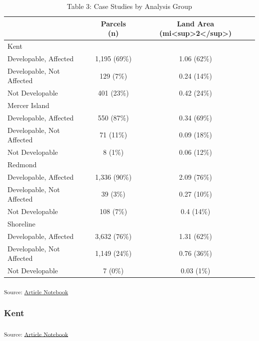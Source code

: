 \documentclass[
]{agujournal2019}
\begin{document}
\begin{longtable}{l|cc}

\caption{\label{tbl-results-case-studies-analysis-group}Table 3: Case
Studies by Analysis Group}

\tabularnewline

\toprule
\multicolumn{1}{l}{} & Parcels (n) & Land Area (mi<sup>2</sup>) \\ 
\midrule
\multicolumn{3}{l}{Kent} \\ 
\midrule
Developable, Affected & 1,195 (69\%) & 1.06 (62\%) \\ 
Developable, Not Affected & 129 (7\%) & 0.24 (14\%) \\ 
Not Developable & 401 (23\%) & 0.42 (24\%) \\ 
\midrule
\multicolumn{3}{l}{Mercer Island} \\ 
\midrule
Developable, Affected & 550 (87\%) & 0.34 (69\%) \\ 
Developable, Not Affected & 71 (11\%) & 0.09 (18\%) \\ 
Not Developable & 8 (1\%) & 0.06 (12\%) \\ 
\midrule
\multicolumn{3}{l}{Redmond} \\ 
\midrule
Developable, Affected & 1,336 (90\%) & 2.09 (76\%) \\ 
Developable, Not Affected & 39 (3\%) & 0.27 (10\%) \\ 
Not Developable & 108 (7\%) & 0.4 (14\%) \\ 
\midrule
\multicolumn{3}{l}{Shoreline} \\ 
\midrule
Developable, Affected & 3,632 (76\%) & 1.31 (62\%) \\ 
Developable, Not Affected & 1,149 (24\%) & 0.76 (36\%) \\ 
Not Developable & 7 (0\%) & 0.03 (1\%) \\ 
\bottomrule

\end{longtable}

\textsubscript{Source:
\href{https://tiernanmartin.github.io/2024-transit-oriented-development-bill/index.qmd.html}{Article
Notebook}}

\subsubsection{Kent}\label{kent}

\textsubscript{Source:
\href{https://tiernanmartin.github.io/2024-transit-oriented-development-bill/index.qmd.html}{Article
Notebook}}
\end{document}

